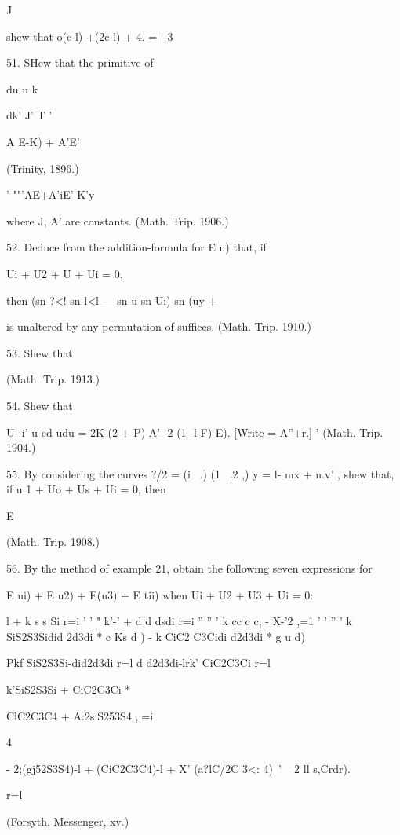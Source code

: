   J 

shew that o(c-l) +(2c-l)  + 4. =  | 3   

51. SHew that the primitive of 

du u  k \  

dk' J' T '  

A E-K) + A'E' 



(Trinity, 1896.) 



'  ""'AE+A'iE'-K'y 

where J, A' are constants. (Math. Trip. 1906.) 

52. Deduce from the addition-formula for E  u) that, if 

Ui + U2 + U  + Ui = 0, 

then (sn  ?<! sn  l<l — sn u  sn Ui) sn (uy + %

is unaltered by any permutation of suffices. (Math. Trip. 1910.) 

53. Shew that 

(Math. Trip. 1913.) 

54. Shew that 

U-  i'  u cd  udu = 2K  (2 + P) A'- 2 (1 -l-F) E). 
[Write   = A''+r.] ' (Math. Trip. 1904.) 

55. By considering the curves ?/2 =   (i \  .) (1 \  .2 ,)  y = l- mx + n.v' , shew that, if 
u 1 + Uo + Us + Ui = 0, then 

E %

(Math. Trip. 1908.) 

56. By the method of example 21, obtain the following seven expressions for 

E ui) + E u2) + E(u3) + E tii) when Ui + U2 + U3 + Ui = 0: 

l + k s s Si r=i ' '  " k'-' + d  d dsdi r=i '' '' ' k cc c c, - X-'2 ,=1 ' ' '' ' 
k SiS2S3Sidid 2d3di * c Ks d ) - k CiC2 C3Cidi d2d3di * g u  d) 

Pkf SiS2S3Si-did2d3di r=l d d2d3di-lrk' CiC2C3Ci r=l 

k'SiS2S3Si + CiC2C3Ci * 

ClC2C3C4 + A:2siS253S4 ,.=i 

4 

- 2;(gj52S3S4)-l + (CiC2C3C4)-l + X' (a?lC/2C 3<: 4)~' ~  2 ll s,Crdr). 

r=l 

(Forsyth, Messenger, xv.) 



